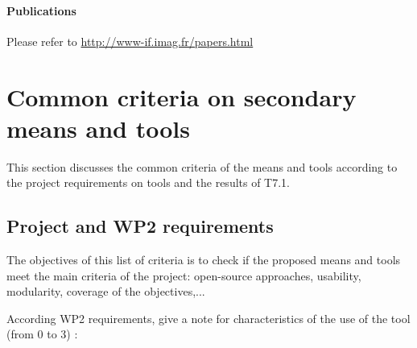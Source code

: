 \paragraph{Publications} Please refer to \url{http://www-if.imag.fr/papers.html}


\section{Common criteria on secondary means and tools}
\label{common}
This section discusses the common criteria of the means and tools according to the project requirements on tools and the results of T7.1.

\subsection{Project and WP2 requirements}

The objectives of this list of criteria is to check if the proposed means and tools meet the main criteria of the project: open-source approaches, usability, modularity, coverage of the objectives,...

According WP2 requirements, give a note for characteristics of the use of the tool (from 0 to 3) :

